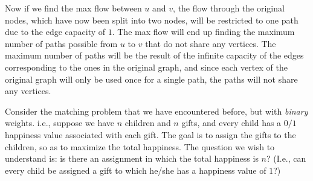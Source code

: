 \documentclass[addpoints]{exam}
\begin{document}
\begin{questions}
\begin{parts}
\begin{center}
\end{center}

Now if we find the max flow between $u$ and $v$, the flow through the original nodes, which have now been split into two nodes, will be restricted to one path due to the edge capacity of $1$. The max flow will end up finding the maximum number of paths possible from $u$ to $v$ that do not share any vertices. The maximum number of paths will be the result of the infinite capacity of the edges corresponding to the ones in the original graph, and since each vertex of the original graph will only be used once for a single path, the paths will not share any vertices.

\end{parts}

Consider the matching problem that we have encountered before, but with {\em binary} weights. i.e., suppose we have $n$ children and $n$ gifts, and every child has a $0/1$ happiness value associated with each gift. The goal is to assign the gifts to the children, so as to maximize the total happiness. The question we wish to understand is: is there an assignment in which the total happiness is $n$? (I.e., can every child be assigned a gift to which he/she has a happiness value of $1$?)

\end{questions}
\end{document}
